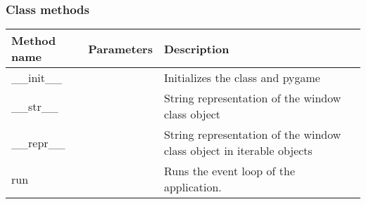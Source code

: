 \documentclass{scrartcl}
\begin{document}
    \subsubsection{Class methods}
    \begin{tabular}{|p{}|p{}|p{}|}
        \hline
        Method name & Parameters & Description\\
        \hline
        \_\_init\_\_ &  & Initializes the class and pygame\\
        \hline
        \_\_str\_\_ & &String representation of the window class object\\
        \hline
        \_\_repr\_\_ & & String representation of the window class object in iterable objects\\
        \hline
        run & & Runs the event loop of the application.\\
        \hline
    \end{tabular}
\end{document}

